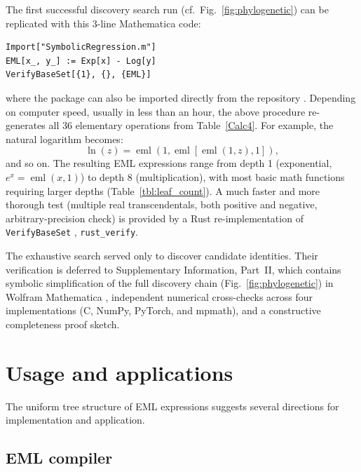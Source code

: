 \documentclass[12pt]{article}
\DeclareMathOperator{\eml}{eml}
\begin{document}
The first successful discovery search run (cf.~Fig.~\ref{fig:phylogenetic}) can be replicated with this 3-line Mathematica code:
\begin{verbatim}
Import["SymbolicRegression.m"]
EML[x_, y_] := Exp[x] - Log[y]
VerifyBaseSet[{1}, {}, {EML}]
\end{verbatim}
where the package can also be imported directly from the repository \cite{SymbolicRegressionPackage}.
Depending on computer speed, usually in less than an hour, the above procedure re-generates all 36 elementary operations 
from Table~\ref{Calc4}. For example, the natural logarithm becomes:
\begin{equation}
\label{eq:eml-ln}
\ln{(z)} = \eml\left( 1,\eml[ \eml(1,z),1 ] \right),
\end{equation}
and so on.
The resulting EML expressions range from depth 1 (exponential, $e^x = \eml(x,1)$) 
to depth 8 (multiplication), with most basic math functions requiring larger depths (Table~\ref{tbl:leaf_count}). A much faster and more thorough test (multiple real transcendentals, both positive and negative, arbitrary-precision check) is provided by a Rust re-implementation of \texttt{VerifyBaseSet} \cite{SymbolicRegressionPackage}, \texttt{rust\_verify}. 

The exhaustive search served only to discover candidate identities. Their verification is deferred to Supplementary Information, Part~II, which contains symbolic simplification of the full discovery chain (Fig.~\ref{fig:phylogenetic}) in Wolfram Mathematica \cite{WolframMathematica}, independent numerical cross-checks across four implementations (C, NumPy, PyTorch, and mpmath), and a constructive completeness proof sketch.


\section{Usage and applications \label{sec:applications}}


The uniform tree structure of EML expressions suggests several directions for implementation and application. 


\subsection{EML compiler \label{subsec:compiler} }
\end{document}
